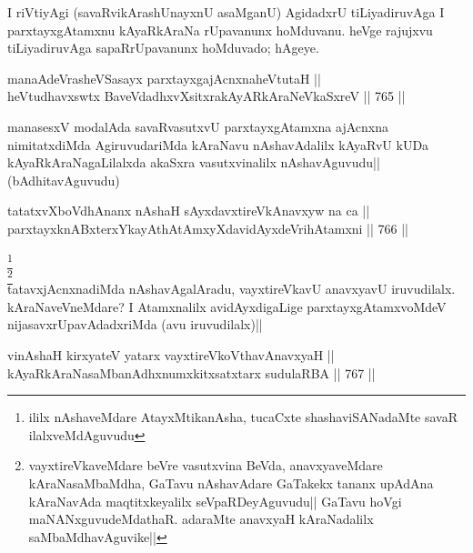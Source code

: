 \begin{artha} 
I riVtiyAgi (savaRvikArashUnayxnU asaMganU) AgidadxrU tiLiyadiruvAga I 
parxtayxgAtamxnu kAyaRkAraNa rUpavanunx hoMduvanu. heVge rajujxvu 
tiLiyadiruvAga sapaRrUpavanunx hoMduvado; hAgeye.  
\end{artha}


\begin{shl}
manaAdeVrasheVSasayx parxtayxgajAcnxnaheVtutaH || \\
heVtudhavxswtx BaveVdadhxvXsitxrakAyARkAraNeV\s kaSxreV ||  765 ||  
\end{shl}

\begin{artha} 
manasesxV modalAda savaRvasutxvU parxtayxgAtamxna ajAcnxna 
nimitatxdiMda AgiruvudariMda kAraNavu nAshavAdalilx kAyaRvU kUDa 
kAyaRkAraNagaLilalxda akaSxra vasutxvinalilx nAshavAguvudu|| 
(bAdhitavAguvudu)
\end{artha}


\begin{shl}
tatatxvXboVdhAnanx nAshaH sAyxdavxtireVkAnavxyw na ca || \\
parxtayxknABxterxYkayAthAtAmxyXdavidAyxdeVrihA\s \s tamxni ||  766 ||  
\end{shl}

\begin{artha} 
\footnote[1]{ililx nAshaveMdare AtayxMtikanAsha, 
tucaCxte shashaviSANadaMte savaR ilalxveMdAguvudu}\\
\footnote[2]{vayxtireVkaveMdare beVre vasutxvina BeVda, anavxyaveMdare 
kAraNasaMbaMdha, GaTavu nAshavAdare GaTakekx tananx upAdAna kAraNavAda 
maqtitxkeyalilx seVpaRDeyAguvudu|| GaTavu hoVgi maNANxguvudeMdathaR. 
adaraMte anavxyaH kAraNadalilx saMbaMdhavAguvike||}\\
tatavxjAcnxnadiMda nAshavAgalAradu, vayxtireVkavU anavxyavU 
iruvudilalx. kAraNaveVneMdare? I Atamxnalilx avidAyxdigaLige 
parxtayxgAtamxvoMdeV nijasavxrUpavAdadxriMda (avu iruvudilalx)||
\end{artha}

\begin{shl}
vinAshaH kirxyateV yatarx vayxtireVkoV\s thavA\s navxyaH ||  \\
kAyaRkAraNasaMbanAdhxnumxkitxsatxtarx sudulaRBA ||  767 ||  
\end{shl}

